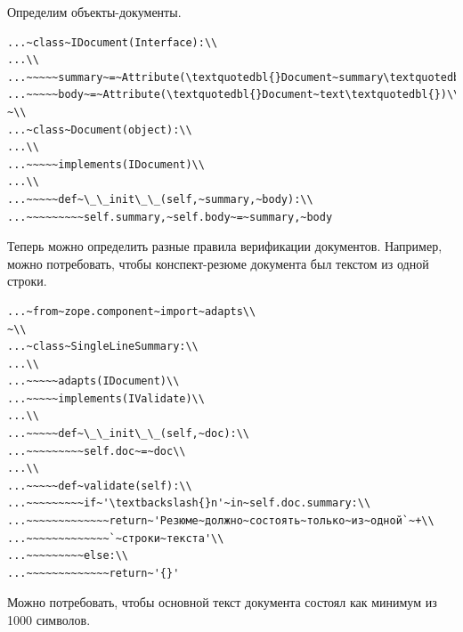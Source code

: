 \documentclass[a4paper,openany,twoside,draft]{book}
\begin{document}
Определим объекты-документы.

\begin{verbatim}
...~class~IDocument(Interface):\\
...\\
...~~~~~summary~=~Attribute(\textquotedbl{}Document~summary\textquotedbl{})\\
...~~~~~body~=~Attribute(\textquotedbl{}Document~text\textquotedbl{})\\
~\\
...~class~Document(object):\\
...\\
...~~~~~implements(IDocument)\\
...\\
...~~~~~def~\_\_init\_\_(self,~summary,~body):\\
...~~~~~~~~~self.summary,~self.body~=~summary,~body
\end{verbatim}

Теперь можно определить разные правила верификации документов.
Например, можно потребовать, чтобы конспект-резюме документа был
текстом из одной строки.

\begin{verbatim}
...~from~zope.component~import~adapts\\
~\\
...~class~SingleLineSummary:\\
...\\
...~~~~~adapts(IDocument)\\
...~~~~~implements(IValidate)\\
...\\
...~~~~~def~\_\_init\_\_(self,~doc):\\
...~~~~~~~~~self.doc~=~doc\\
...\\
...~~~~~def~validate(self):\\
...~~~~~~~~~if~'\textbackslash{}n'~in~self.doc.summary:\\
...~~~~~~~~~~~~~return~'Резюме~должно~состоять~только~из~одной`~+\\
...~~~~~~~~~~~~~`~строки~текста'\\
...~~~~~~~~~else:\\
...~~~~~~~~~~~~~return~'{}'
\end{verbatim}

Можно потребовать, чтобы основной текст документа состоял как минимум
из 1000 символов.
\end{document}
